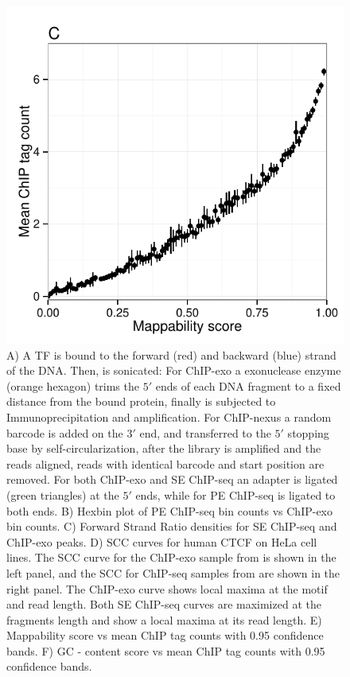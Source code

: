 \documentclass{bmcart}
\begin{document}
\begin{figure}[h!]
  \includegraphics[width = .4\textwidth,page = 2]{figures/fig1/eukaryotic_bias_CTCF.pdf}
  \caption{A) A TF is bound to the forward (red) and backward (blue)
    strand of the DNA. Then, is sonicated: For ChIP-exo a exonuclease
    enzyme (orange hexagon) trims the $5\prime$ ends of each DNA
    fragment to a fixed distance from the bound protein, finally is
    subjected to Immunoprecipitation and amplification. For ChIP-nexus
    a random barcode is added on the $3\prime$ end, and transferred to
    the $5\prime$ stopping base by self-circularization, after the
    library is amplified and the reads aligned, reads with identical
    barcode and start position are removed. For both ChIP-exo and SE
    ChIP-seq an adapter is ligated (green triangles) at the $5\prime$
    ends, while for PE ChIP-seq is ligated to both ends.  B) Hexbin
    plot of PE ChIP-seq bin counts vs ChIP-exo bin counts. C) Forward
    Strand Ratio densities for SE ChIP-seq and ChIP-exo peaks. D) SCC
    curves for human CTCF on HeLa cell lines.  The SCC curve for the
    ChIP-exo sample from \cite{exo1} is shown in the left panel, and
    the SCC for ChIP-seq samples from \cite{encode1} are shown in the
    right panel. The ChIP-exo curve shows local maxima at the motif
    and read length. Both SE ChIP-seq curves are maximized at the
    fragments length and show a local maxima at its read length. E)
    Mappability score vs mean ChIP tag counts with 0.95 confidence
    bands. F) GC - content score vs mean ChIP tag counts with 0.95
    confidence bands.}
  \label{fig:1}
\end{figure}



\newpage

\end{document}
